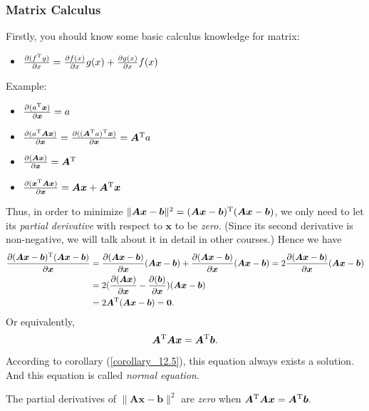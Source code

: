 \subsubsection{Matrix Calculus}
Firstly, you should know some basic calculus knowledge for matrix:
\begin{itemize}
\item
$\frac{\partial(f^{\mathrm T} g)}{\partial x}=\frac{\partial f(x)}{\partial x}g(x)+\frac{\partial g(x)}{\partial x}f(x)$
\end{itemize}
Example:
\begin{itemize}
\item
$\frac{\partial(a^{\mathrm T} \bm x)}{\partial \bm x}=a$
\item
$\frac{\partial(a^{\mathrm T} \bm A\bm x)}{\partial \bm x}=\frac{\partial((\bm A^{\mathrm T} a)^{\mathrm T}\bm x)}{\partial \bm x}=\bm A^{\mathrm T} a$
\item
$\frac{\partial(\bm A\bm x)}{\partial \bm x}=\bm A^{\mathrm T}$
\item
$\frac{\partial(\bm x^{\mathrm T}\bm A\bm x)}{\partial \bm x}=\bm A\bm x+\bm A^{\mathrm T}\bm x$
\end{itemize}
Thus, in order to minimize $\|\bm{Ax}-\bm b\|^2=(\bm{Ax}-\bm b)^{\mathrm T}(\bm{Ax}-\bm b)$, we only need to let its \emph{partial derivative} with respect to $\bm x$ to be \emph{zero.} (Since its second derivative is non-negative, we will talk about it in detail in other courses.) Hence we have
\[\begin{aligned}
\frac{\partial (\bm{Ax}-\bm b)^{\mathrm T}(\bm{Ax}-\bm b)}{\partial \bm x}&=\frac{\partial(\bm{Ax}-\bm b)}{\partial \bm x}(\bm{Ax}-\bm b)+\frac{\partial(\bm{Ax}-\bm b)}{\partial \bm x}(\bm{Ax}-\bm b)=2\frac{\partial(\bm{Ax}-\bm b)}{\partial \bm x}(\bm{Ax}-\bm b)\\
&=2(\frac{\partial(\bm A\bm x)}{\partial \bm x}-\frac{\partial(\bm b)}{\partial \bm x})(\bm{Ax}-\bm b)\\
&=2\bm A^{\mathrm T}(\bm{Ax}-\bm b)=\bm 0.
\end{aligned}
\]
Or equivalently, 
\[
\bm A^{\mathrm T}\bm{Ax}=\bm A^{\mathrm T}\bm b.
\]
According to corollary (\ref{corollary_12.5}), this equation always exists a solution. And this equation is called \emph{normal equation}.
\begin{theorem}\label{theorem_12.4}
The partial derivatives of $\|\bm{Ax}-\bm b\|^2$ are \emph{zero} when $\bm A^{\mathrm T}\bm{Ax}=\bm A^{\mathrm T}\bm b.$
\end{theorem}
